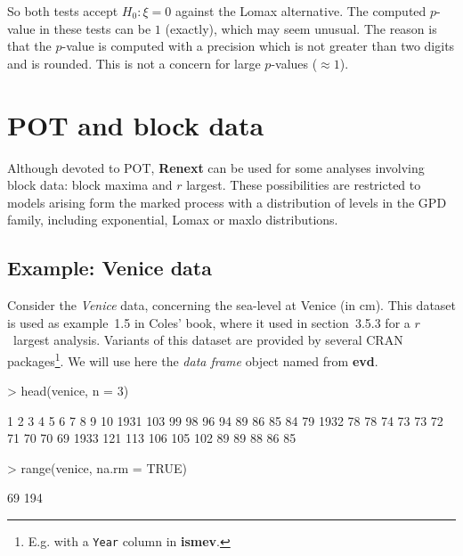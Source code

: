 \documentclass[a4paper]{report}
\newcommand{\pkg}[1]{\textbf{#1}}
\begin{document}
\noindent
So both tests accept $H_0: \xi = 0$ against the Lomax alternative.
The computed $p$-value in these tests can be $1$ (exactly), which may
seem unusual.  The reason is that the $p$-value is computed with a
precision which is not greater than two digits and is rounded.  This
is not a concern for large $p$-values ($\approx 1$).





\chapter{POT and block data}

\label{Chap-POTBlocks}

Although devoted to POT, \pkg{Renext} can be used for some analyses
involving block data: block maxima and $r$ largest. These
possibilities are restricted to models arising form the marked process
with a distribution of levels in the GPD family, including
exponential, Lomax or maxlo distributions.

\section{Example: Venice data}

Consider the \textit{Venice} data, concerning the sea-level at Venice (in cm).
This dataset is used as example~1.5 in Coles' book, where it used
in section~3.5.3 for a $r$~largest analysis. Variants
of this dataset are provided by several CRAN 
packages\footnote{E.g. with a \texttt{Year} column in \textbf{ismev}.}. We will
use here the \textit{data frame} object named \verb@venice@ from \pkg{evd}.
\begin{Schunk}
\begin{Sinput}
> head(venice, n = 3)
\end{Sinput}
\begin{Soutput}
       1   2   3   4   5  6  7  8  9 10
1931 103  99  98  96  94 89 86 85 84 79
1932  78  78  74  73  73 72 71 70 70 69
1933 121 113 106 105 102 89 89 88 86 85
\end{Soutput}
\begin{Sinput}
> range(venice, na.rm = TRUE)
\end{Sinput}
\begin{Soutput}
[1]  69 194
\end{Soutput}
\end{Schunk}
\end{document}
